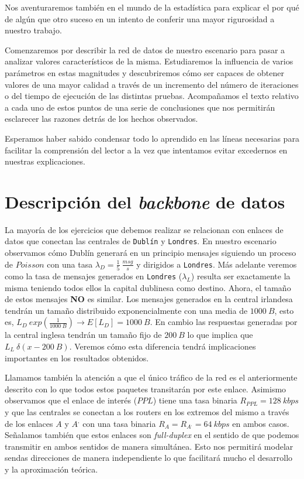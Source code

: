 \documentclass{article}[10pt]
\begin{document}
		Nos aventuraremos también en el mundo de la estadística para explicar el por qué de algún que otro suceso en un intento de conferir una mayor rigurosidad a nuestro trabajo.

		Comenzaremos por describir la red de datos de nuestro escenario para pasar a analizar valores característicos de la misma. Estudiaremos la influencia de varios parámetros en estas magnitudes y descubriremos cómo ser capaces de obtener valores de una mayor calidad a través de un incremento del número de iteraciones o del tiempo de ejecución de las distintas pruebas. Acompañamos el texto relativo a cada uno de estos puntos de una serie de conclusiones que nos permitirán esclarecer las razones detrás de los hechos observados.

		Esperamos haber sabido condensar todo lo aprendido en las líneas necesarias para facilitar la comprensión del lector a la vez que intentamos evitar excedernos en nuestras explicaciones.

	\section{Descripción del \textit{backbone} de datos}
		La mayoría de los ejercicios que debemos realizar se relacionan con enlaces de datos que conectan las centrales de \texttt{Dublín} y \texttt{Londres}. En nuestro escenario observamos cómo Dublín generará en un principio mensajes siguiendo un proceso de $Poisson$ con una tasa $\lambda_D = \frac{1}{5}\ \frac{msg}{s}$ y dirigidos a \texttt{Londres}. Más adelante veremos como la tasa de mensajes generados en \texttt{Londres} ($\lambda_L$) resulta ser exactamente la misma teniendo todos ellos la capital dublinesa como destino. Ahora, el tamaño de estos mensajes \textbf{NO} es similar. Los mensajes generados en la central irlandesa tendrán un tamaño distribuido exponencialmente con una media de $1000\ B$, esto es, $L_D ~ exp(\frac{1}{1000\ B}) \rightarrow E[L_D] = 1000\ B$. En cambio las respuestas generadas por la central inglesa tendrán un tamaño fijo de $200\ B$ lo que implica que $L_L ~ \delta(x - 200\ B)$. Veremos cómo esta diferencia tendrá implicaciones importantes en los resultados obtenidos.

		Llamamos también la atención a que el único tráfico de la red es el anteriormente descrito con lo que todos estos paquetes transitarán por este enlace. Asimismo observamos que el enlace de interés ($PPL$) tiene una tasa binaria $R_{PPL} = 128\ kbps$ y que las centrales se conectan a los routers en los extremos del mismo a través de los enlaces $A$ y $A^,$ con una tasa binaria $R_A = R_{A^,} = 64\ kbps$ en ambos casos. Señalamos también que estos enlaces son \textit{full-duplex} en el sentido de que podemos transmitir en ambos sentidos de manera simultánea. Esto nos permitirá modelar sendas direcciones de manera independiente lo que facilitará mucho el desarrollo y la aproximación teórica.
\end{document}
